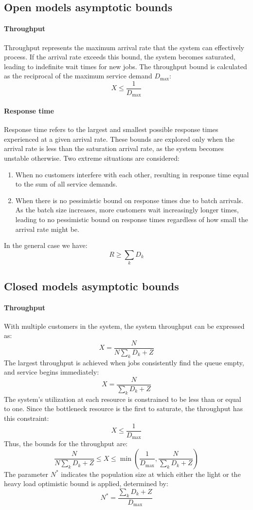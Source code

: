 \subsection{Open models asymptotic bounds}
\paragraph*{Throughput}
Throughput represents the maximum arrival rate that the system can effectively process. 
If the arrival rate exceeds this bound, the system becomes saturated, leading to indefinite wait times for new jobs.
The throughput bound is calculated as the reciprocal of the maximum service demand $D_{\max}$:
\[X\leq\dfrac{1}{D_{\max}}\]
\paragraph*{Response time}
Response time refers to the largest and smallest possible response times experienced at a given arrival rate. 
These bounds are explored only when the arrival rate is less than the saturation arrival rate, as the system becomes unstable otherwise. 
Two extreme situations are considered:
\begin{enumerate}
    \item When no customers interfere with each other, resulting in response time equal to the sum of all service demands.
    \item When there is no pessimistic bound on response times due to batch arrivals. 
        As the batch size increases, more customers wait increasingly longer times, leading to no pessimistic bound on response times regardless of how small the arrival rate might be.
\end{enumerate}
In the general case we have:
\[R\geq\sum_kD_k\]

\subsection{Closed models asymptotic bounds}
\paragraph*{Throughput}
With multiple customers in the system, the system throughput can be expressed as:
\[X=\dfrac{N}{N\sum_kD_k+Z}\]
The largest throughput is achieved when jobs consistently find the queue empty, and service begins immediately:
\[X=\dfrac{N}{\sum_kD_k+Z}\]
The system's utilization at each resource is constrained to be less than or equal to one. 
Since the bottleneck resource is the first to saturate, the throughput has this constraint:
\[X\leq\frac{1}{D_{\max}}\] 
Thus, the bounds for the throughput are:
\[\dfrac{N}{N\sum_kD_k+Z}\leq X \leq \min\left(\frac{1}{D_{\max}},\dfrac{N}{\sum_kD_k+Z}\right)\]
The parameter $N^\ast$ indicates the population size at which either the light or the heavy load optimistic bound is applied, determined by:
\[N^\ast=\dfrac{\sum_kD_k+Z}{D_{\max}}\]
